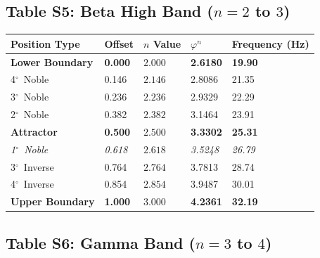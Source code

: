 \documentclass[11pt,a4paper]{article}
\newcommand{\degree}{$^\circ$}  %
\newcommand{\phisym}{\varphi}
\begin{document}
\subsection*{Table S5: Beta High Band ($n = 2$ to $3$)}

\begin{table}[H]
\centering
\begin{tabular}{@{}lllll@{}}
\toprule
Position Type & Offset & $n$ Value & $\phisym^n$ & Frequency (Hz) \\
\midrule
\textbf{Lower Boundary} & \textbf{0.000} & $\mathbf{2.000}$ & \textbf{2.6180} & \textbf{19.90} \\
4\degree\ Noble & 0.146 & $2.146$ & 2.8086 & 21.35 \\
3\degree\ Noble & 0.236 & $2.236$ & 2.9329 & 22.29 \\
2\degree\ Noble & 0.382 & $2.382$ & 3.1464 & 23.91 \\
\textbf{Attractor} & \textbf{0.500} & $\mathbf{2.500}$ & \textbf{3.3302} & \textbf{25.31} \\
\textit{1\degree\ Noble} & \textit{0.618} & $2.618$ & \textit{3.5248} & \textit{26.79} \\
3\degree\ Inverse & 0.764 & $2.764$ & 3.7813 & 28.74 \\
4\degree\ Inverse & 0.854 & $2.854$ & 3.9487 & 30.01 \\
\textbf{Upper Boundary} & \textbf{1.000} & $\mathbf{3.000}$ & \textbf{4.2361} & \textbf{32.19} \\
\bottomrule
\end{tabular}
\end{table}

\subsection*{Table S6: Gamma Band ($n = 3$ to $4$)}
\end{document}
